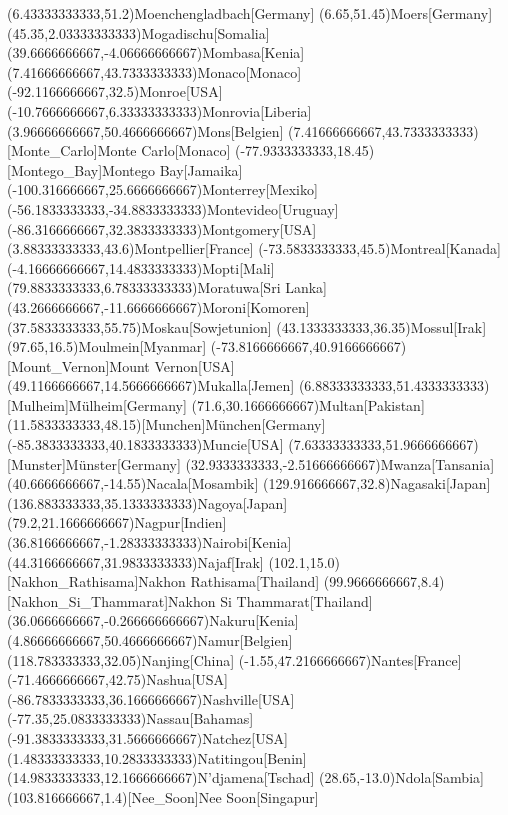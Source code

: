 \mapput(6.43333333333,51.2){Moenchengladbach}[Germany]
\mapput(6.65,51.45){Moers}[Germany]
\mapput(45.35,2.03333333333){Mogadischu}[Somalia]
\mapput(39.6666666667,-4.06666666667){Mombasa}[Kenia]
\mapput(7.41666666667,43.7333333333){Monaco}[Monaco]
\mapput(-92.1166666667,32.5){Monroe}[USA]
\mapput(-10.7666666667,6.33333333333){Monrovia}[Liberia]
\mapput(3.96666666667,50.4666666667){Mons}[Belgien]
\mapput(7.41666666667,43.7333333333)[Monte_Carlo]{Monte Carlo}[Monaco]
\mapput(-77.9333333333,18.45)[Montego_Bay]{Montego Bay}[Jamaika]
\mapput(-100.316666667,25.6666666667){Monterrey}[Mexiko]
\mapput(-56.1833333333,-34.8833333333){Montevideo}[Uruguay]
\mapput(-86.3166666667,32.3833333333){Montgomery}[USA]
\mapput(3.88333333333,43.6){Montpellier}[France]
\mapput(-73.5833333333,45.5){Montreal}[Kanada]
\mapput(-4.16666666667,14.4833333333){Mopti}[Mali]
\mapput(79.8833333333,6.78333333333){Moratuwa}[Sri Lanka]
\mapput(43.2666666667,-11.6666666667){Moroni}[Komoren]
\mapput(37.5833333333,55.75){Moskau}[Sowjetunion]
\mapput(43.1333333333,36.35){Mossul}[Irak]
\mapput(97.65,16.5){Moulmein}[Myanmar]
\mapput(-73.8166666667,40.9166666667)[Mount_Vernon]{Mount Vernon}[USA]
\mapput(49.1166666667,14.5666666667){Mukalla}[Jemen]
\mapput(6.88333333333,51.4333333333)[Mulheim]{Mülheim}[Germany]
\mapput(71.6,30.1666666667){Multan}[Pakistan]
\mapput(11.5833333333,48.15)[Munchen]{München}[Germany]
\mapput(-85.3833333333,40.1833333333){Muncie}[USA]
\mapput(7.63333333333,51.9666666667)[Munster]{Münster}[Germany]
\mapput(32.9333333333,-2.51666666667){Mwanza}[Tansania]
\mapput(40.6666666667,-14.55){Nacala}[Mosambik]
\mapput(129.916666667,32.8){Nagasaki}[Japan]
\mapput(136.883333333,35.1333333333){Nagoya}[Japan]
\mapput(79.2,21.1666666667){Nagpur}[Indien]
\mapput(36.8166666667,-1.28333333333){Nairobi}[Kenia]
\mapput(44.3166666667,31.9833333333){Najaf}[Irak]
\mapput(102.1,15.0)[Nakhon_Rathisama]{Nakhon Rathisama}[Thailand]
\mapput(99.9666666667,8.4)[Nakhon_Si_Thammarat]{Nakhon Si Thammarat}[Thailand]
\mapput(36.0666666667,-0.266666666667){Nakuru}[Kenia]
\mapput(4.86666666667,50.4666666667){Namur}[Belgien]
\mapput(118.783333333,32.05){Nanjing}[China]
\mapput(-1.55,47.2166666667){Nantes}[France]
\mapput(-71.4666666667,42.75){Nashua}[USA]
\mapput(-86.7833333333,36.1666666667){Nashville}[USA]
\mapput(-77.35,25.0833333333){Nassau}[Bahamas]
\mapput(-91.3833333333,31.5666666667){Natchez}[USA]
\mapput(1.48333333333,10.2833333333){Natitingou}[Benin]
\mapput(14.9833333333,12.1666666667){N'djamena}[Tschad]
\mapput(28.65,-13.0){Ndola}[Sambia]
\mapput(103.816666667,1.4)[Nee_Soon]{Nee Soon}[Singapur]
